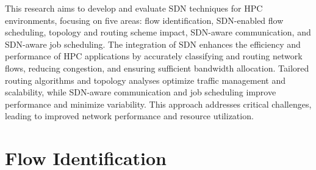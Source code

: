 This research aims to develop and evaluate SDN techniques for HPC environments, focusing on five areas: flow identification, SDN-enabled flow scheduling, topology and routing scheme impact, SDN-aware communication, and SDN-aware job scheduling. The integration of SDN enhances the efficiency and performance of HPC applications by accurately classifying and routing network flows, reducing congestion, and ensuring sufficient bandwidth allocation. Tailored routing algorithms and topology analyses optimize traffic management and scalability, while SDN-aware communication and job scheduling improve performance and minimize variability. This approach addresses critical challenges, leading to improved network performance and resource utilization.

\section{Flow Identification}
